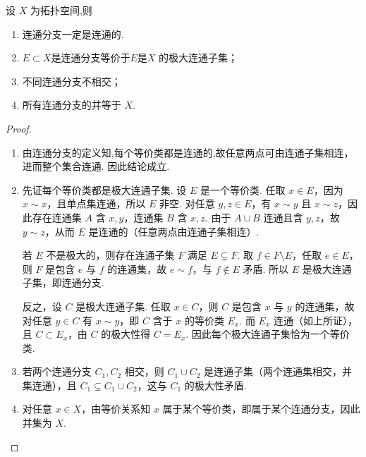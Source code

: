 \documentclass[../../main.tex]{subfiles}%
\begin{document}
\begin{proposition}\label{proposition:连通分支的基本性质}
设 $X$ 为拓扑空间,则
\begin{enumerate}[(1)]
\item\label{proposition:连通分支的基本性质-1} 连通分支一定是连通的.
\item\label{proposition:连通分支的基本性质-2} $E\subset X$是连通分支等价于$E$是$X$ 的极大连通子集；
\item\label{proposition:连通分支的基本性质-3} 不同连通分支不相交；
\item\label{proposition:连通分支的基本性质-4} 所有连通分支的并等于 $X$.
\end{enumerate}
\end{proposition}
\begin{proof}
\begin{enumerate}[(1)]
\item 由连通分支的定义知,每个等价类都是连通的,故任意两点可由连通子集相连，进而整个集合连通. 因此结论成立.

\item 先证每个等价类都是极大连通子集. 设 $E$ 是一个等价类. 任取 $x\in E$，因为 $x\sim x$，且单点集连通，所以 $E$ 非空. 对任意 $y,z\in E$，有 $x\sim y$ 且 $x\sim z$，因此存在连通集 $A$ 含 $x,y$，连通集 $B$ 含 $x,z$. 由于 $A\cup B$ 连通且含 $y,z$，故 $y\sim z$，从而 $E$ 是连通的（任意两点由连通子集相连）.

若 $E$ 不是极大的，则存在连通子集 $F$ 满足 $E\subsetneq F$. 取 $f\in F\setminus E$，任取 $e\in E$，则 $F$ 是包含 $e$ 与 $f$ 的连通集，故 $e\sim f$，与 $f\notin E$ 矛盾. 所以 $E$ 是极大连通子集，即连通分支.

反之，设 $C$ 是极大连通子集. 任取 $x\in C$，则 $C$ 是包含 $x$ 与 $y$ 的连通集，故对任意 $y\in C$ 有 $x\sim y$，即 $C$ 含于 $x$ 的等价类 $E_x$. 而 $E_x$ 连通（如上所证），且 $C\subset E_x$，由 $C$ 的极大性得 $C=E_x$. 因此每个极大连通子集恰为一个等价类.

\item 若两个连通分支 $C_1,C_2$ 相交，则 $C_1\cup C_2$ 是连通子集（两个连通集相交，并集连通），且 $C_1\subsetneq C_1\cup C_2$，这与 $C_1$ 的极大性矛盾.
\item 对任意 $x\in X$，由等价关系知 $x$ 属于某个等价类，即属于某个连通分支，因此并集为 $X$.
\end{enumerate}
\end{proof}
\end{document}
